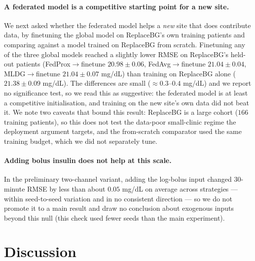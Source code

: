 \documentclass[10pt,letterpaper]{article}
\begin{document}
\paragraph{A federated model is a competitive starting point for a new site.} We
next asked whether the federated model helps a \emph{new} site that does
contribute data, by finetuning the global model on ReplaceBG's own training
patients and comparing against a model trained on ReplaceBG from scratch.
Finetuning any of the three global models reached a slightly lower RMSE on
ReplaceBG's held-out patients (FedProx$\rightarrow$finetune $20.98 \pm 0.06$,
FedAvg$\rightarrow$finetune $21.04 \pm 0.04$, MLDG$\rightarrow$finetune
$21.04 \pm 0.07$ mg/dL) than training on ReplaceBG alone
($21.38 \pm 0.09$ mg/dL). The differences are small ($\approx 0.3$--$0.4$ mg/dL)
and we report no significance test, so we read this as suggestive: the federated
model is at least a competitive initialisation, and training on the new site's
own data did not beat it. We note two caveats that bound this result: ReplaceBG
is a large cohort ($166$ training patients), so this does not test the
data-poor small-clinic regime the deployment argument targets, and the
from-scratch comparator used the same training budget, which we did not
separately tune.

\paragraph{Adding bolus insulin does not help at this scale.} In the preliminary
two-channel variant, adding the log-bolus input changed 30-minute RMSE by less
than about $0.05$ mg/dL on average across strategies --- within seed-to-seed
variation and in no consistent direction --- so we do not promote it to a main
result and draw no conclusion about exogenous inputs beyond this null (this check
used fewer seeds than the main experiment).

\section*{Discussion}
\end{document}
